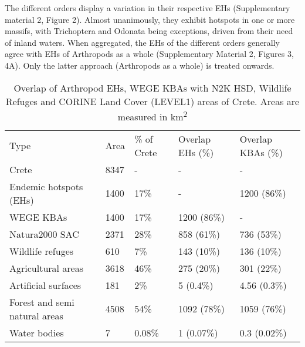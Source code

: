 The different orders display a variation in their respective EHs (Supplementary material 2, Figure 2).
Almost unanimously, they exhibit hotspots in one or more massifs,
with Trichoptera and Odonata being exceptions, driven from their need of inland waters.
When aggregated, the EHs of the different orders generally agree with EHs of
Arthropods as a whole (Supplementary Material 2, Figures 3, 4A). Only the
latter approach (Arthropods as a whole) is treated onwards.

\begin{table}[]
\caption{Overlap of Arthropod EHs, WEGE KBAs with N2K HSD, Wildlife Refuges and CORINE Land Cover (LEVEL1) areas of Crete. Areas are measured in km\textsuperscript{2}}
\begin{tabular}{lllll}
Type                          & Area       & \% of Crete & Overlap EHs (\%)                          & Overlap KBAs (\%)                  \\
Crete                         & 8347       & -           & -                                      & -                               \\
Endemic hotspots (EHs)        & 1400       & 17\%        & -                                      & 1200 (86\%)                     \\
WEGE KBAs                     & 1400       & 17\%        & 1200 (86\%)                            & -                               \\
Natura2000 SAC                & 2371       & 28\%        & 858 (61\%)                             & 736 (53\%)                      \\
Wildlife refuges              & 610        & 7\%         & 143 (10\%)                             & 136 (10\%)                      \\
Agricultural areas            & 3618       & 46\%        & 275 (20\%)                             & 301 (22\%)                      \\
Artificial surfaces           & 181        & 2\%         & 5 (0.4\%)                              & 4.56 (0.3\%)                    \\
Forest and semi natural areas & 4508       & 54\%        & 1092 (78\%)                            & 1059 (76\%)                     \\
Water bodies                  & 7          & 0.08\%      & 1 (0.07\%)                             & 0.3 (0.02\%)                   
\end{tabular}
\label{arthropods-overlaps}
\end{table}


